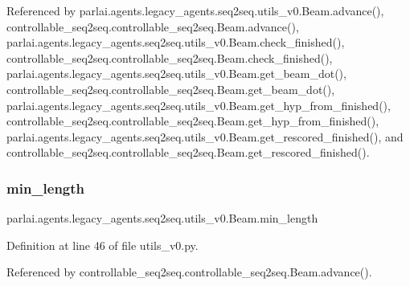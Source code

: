 Referenced by parlai.\+agents.\+legacy\+\_\+agents.\+seq2seq.\+utils\+\_\+v0.\+Beam.\+advance(), controllable\+\_\+seq2seq.\+controllable\+\_\+seq2seq.\+Beam.\+advance(), parlai.\+agents.\+legacy\+\_\+agents.\+seq2seq.\+utils\+\_\+v0.\+Beam.\+check\+\_\+finished(), controllable\+\_\+seq2seq.\+controllable\+\_\+seq2seq.\+Beam.\+check\+\_\+finished(), parlai.\+agents.\+legacy\+\_\+agents.\+seq2seq.\+utils\+\_\+v0.\+Beam.\+get\+\_\+beam\+\_\+dot(), controllable\+\_\+seq2seq.\+controllable\+\_\+seq2seq.\+Beam.\+get\+\_\+beam\+\_\+dot(), parlai.\+agents.\+legacy\+\_\+agents.\+seq2seq.\+utils\+\_\+v0.\+Beam.\+get\+\_\+hyp\+\_\+from\+\_\+finished(), controllable\+\_\+seq2seq.\+controllable\+\_\+seq2seq.\+Beam.\+get\+\_\+hyp\+\_\+from\+\_\+finished(), parlai.\+agents.\+legacy\+\_\+agents.\+seq2seq.\+utils\+\_\+v0.\+Beam.\+get\+\_\+rescored\+\_\+finished(), and controllable\+\_\+seq2seq.\+controllable\+\_\+seq2seq.\+Beam.\+get\+\_\+rescored\+\_\+finished().

\mbox{\label{classparlai_1_1agents_1_1legacy__agents_1_1seq2seq_1_1utils__v0_1_1Beam_a7d6ef73f817ea0cddaaa2857f5fab206}} 
\subsubsection{\texorpdfstring{min\+\_\+length}{min\_length}}
{\footnotesize\ttfamily parlai.\+agents.\+legacy\+\_\+agents.\+seq2seq.\+utils\+\_\+v0.\+Beam.\+min\+\_\+length}



Definition at line 46 of file utils\+\_\+v0.\+py.



Referenced by controllable\+\_\+seq2seq.\+controllable\+\_\+seq2seq.\+Beam.\+advance().

\mbox{\label{classparlai_1_1agents_1_1legacy__agents_1_1seq2seq_1_1utils__v0_1_1Beam_a7709dc9d035f249283776d08ca4d93c8}} 
